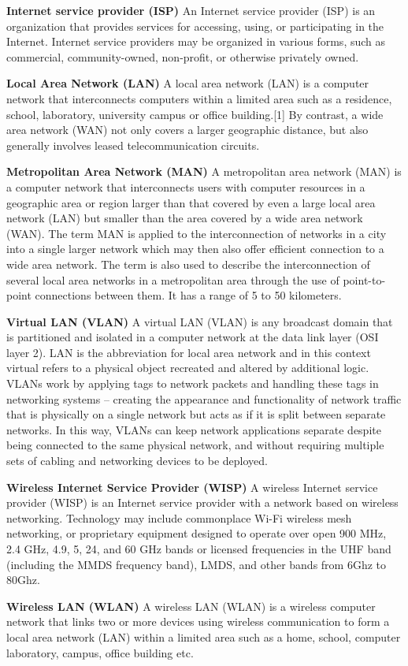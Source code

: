 \textbf{Internet service provider (ISP)}
\label{term_isp}
An Internet service provider (ISP) is an organization that provides services for accessing, using, or participating in the Internet. Internet service providers may be organized in various forms, such as commercial, community-owned, non-profit, or otherwise privately owned.

\textbf{Local Area Network (LAN)}
\label{term_lan}
A local area network (LAN) is a computer network that interconnects computers within a limited area such as a residence, school, laboratory, university campus or office building.[1] By contrast, a wide area network (WAN) not only covers a larger geographic distance, but also generally involves leased telecommunication circuits.

\textbf{Metropolitan Area Network (MAN)}
\label{term_man}
A metropolitan area network (MAN) is a computer network that interconnects users with computer resources in a geographic area or region larger than that covered by even a large local area network (LAN) but smaller than the area covered by a wide area network (WAN). The term MAN is applied to the interconnection of networks in a city into a single larger network which may then also offer efficient connection to a wide area network. The term is also used to describe the interconnection of several local area networks in a metropolitan area through the use of point-to-point connections between them. It has a range of 5 to 50 kilometers. 

\textbf{Virtual LAN (VLAN)}
\label{term_vlan}
A virtual LAN (VLAN) is any broadcast domain that is partitioned and isolated in a computer network at the data link layer (OSI layer 2). LAN is the abbreviation for local area network and in this context virtual refers to a physical object recreated and altered by additional logic. VLANs work by applying tags to network packets and handling these tags in networking systems – creating the appearance and functionality of network traffic that is physically on a single network but acts as if it is split between separate networks. In this way, VLANs can keep network applications separate despite being connected to the same physical network, and without requiring multiple sets of cabling and networking devices to be deployed.

\textbf{Wireless Internet Service Provider (WISP)}
\label{term_wisp}
A wireless Internet service provider (WISP) is an Internet service provider with a network based on wireless networking. Technology may include commonplace Wi-Fi wireless mesh networking, or proprietary equipment designed to operate over open 900 MHz, 2.4 GHz, 4.9, 5, 24, and 60 GHz bands or licensed frequencies in the UHF band (including the MMDS frequency band), LMDS, and other bands from 6Ghz to 80Ghz.

\textbf{Wireless LAN (WLAN)}
\label{term_wlan}
A wireless LAN (WLAN) is a wireless computer network that links two or more devices using wireless communication to form a local area network (LAN) within a limited area such as a home, school, computer laboratory, campus, office building etc.

